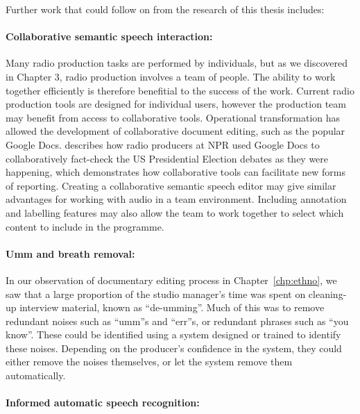 Further work that could follow on from the research of this thesis includes:

\paragraph{Collaborative semantic speech interaction:}
Many radio production tasks are performed by individuals, but as we discovered in Chapter 3, radio production involves
a team of people. The ability to work  together efficiently is therefore benefitial to the success of the work. Current
radio production tools are designed for individual users, however the production team may benefit from access to
collaborative tools.  Operational transformation has allowed the development of collaborative document editing, such as
the popular Google Docs. \citet{Fisher2016} describes how radio producers at NPR used Google Docs to collaboratively
fact-check the US Presidential Election debates as they were happening, which demonstrates how collaborative tools can
facilitate new forms of reporting.  Creating a collaborative semantic speech editor may give similar advantages for
working with audio in a team environment. Including annotation and labelling features may also allow the team to work
together to select which content to include in the programme.


\paragraph{Umm and breath removal:}
In our observation of documentary editing process in Chapter~\ref{chp:ethno}, we saw that a large proportion of the
studio manager's time was spent on cleaning-up interview material, known as ``de-umming''. Much of this was to remove
redundant noises such as ``umm''s and ``err''s, or redundant phrases such as ``you know''. These could be identified
using a system designed or trained to identify these noises.  Depending on the producer's confidence in the system,
they could either remove the noises themselves, or let the system remove them automatically.

\paragraph{Informed automatic speech recognition:}

